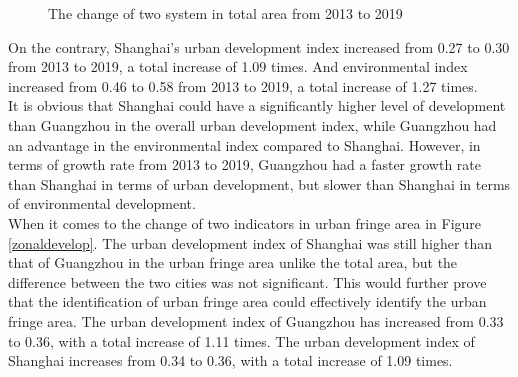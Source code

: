 \begin{figure}[H]
\centering
{}
\quad
{}

\caption{The change of two system in total area from 2013 to 2019}
\label{totaldevelop}
\end{figure}

On the contrary, Shanghai's urban development index increased from 0.27 to 0.30 from 2013 to 2019, a total increase of 1.09 times. And environmental index increased from 0.46 to 0.58 from 2013 to 2019, a total increase of 1.27 times.\\

It is obvious that Shanghai could have a significantly higher level of development than Guangzhou in the overall urban development index, while Guangzhou had an advantage in the environmental index compared to Shanghai. However, in terms of growth rate from 2013 to 2019, Guangzhou had a faster growth rate than Shanghai in terms of urban development, but slower than Shanghai in terms of environmental development.\\

When it comes to the change of two indicators in urban fringe area in Figure \ref{zonaldevelop}. The urban development index of Shanghai was still higher than that of Guangzhou in the urban fringe area unlike the total area, but the difference between the two cities was not significant. This would further prove that the identification of urban fringe area could effectively identify the urban fringe area. The urban development index of Guangzhou has increased from 0.33 to 0.36, with a total increase of 1.11 times. The urban development index of Shanghai increases from 0.34 to 0.36, with a total increase of 1.09 times.\\

